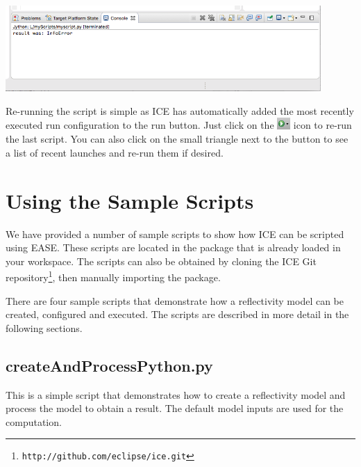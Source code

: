 \documentclass{article}
\begin{document}
\begin{center}
\includegraphics[width=12cm]{images/console}
\end{center}

Re-running the script is simple as ICE has automatically added the most recently
executed run configuration to the run button. Just click on the
\includegraphics[width=0.5cm]{images/runbutton} icon to re-run the last script.
You can also click on the small triangle next to the button to see a list of 
recent launches and re-run them if desired. 

\section{Using the Sample Scripts}

\lstset{basicstyle=\ttfamily\scriptsize, breaklines}
\makeatletter
\def\lst@lettertrue{\let\lst@ifletter\iffalse}
\makeatother

We have provided a number of sample scripts to show how ICE can be
scripted using EASE.
These scripts are located in the
 package that is already loaded
in your workspace. The scripts can also be obtained by cloning the ICE Git
repository\footnote{\texttt{http://github.com/eclipse/ice.git}},
then manually importing the 
package.

There are four sample scripts that demonstrate how a reflectivity model
can be created, configured and executed. The scripts are described in
more detail in the following sections.

\subsection{createAndProcessPython.py} 

This is a simple script
that demonstrates how to create a reflectivity model and process the model to
obtain a result. The default model inputs are used for the computation.
\end{document}

